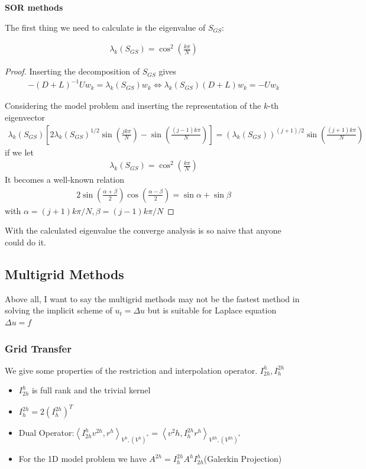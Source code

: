 \documentclass[12pt]{amsart}
\begin{document}
\textbf{SOR methods}

The first thing we need to calculate is the eigenvalue of $S_{GS}$:

\begin{align*}
\lambda_k(S_{GS})=\cos^2(\frac{k\pi}{N})
\end{align*}

\begin{proof}
	Inserting the decomposition of $S_{GS}$ gives
	\begin{align*}
	-(D+L)^{-1}Uw_k = \lambda_k(S_{GS})w_k \Leftrightarrow \lambda_k(S_{GS})(D+L)w_k=-Uw_k
	\end{align*}
	
	Considering the model problem and inserting the representation of the $k$-th eigenvector 
	\begin{align*}
	\lambda_k(S_{GS})\left[2 \lambda_k(S_{GS})^{1/2}\sin(\frac{jk\pi}{N}) -\sin(\frac{(j-1)k\pi}{N}) \right]=(\lambda_k(S_{GS}))^{(j+1)/2}\sin(\frac{(j+1)k\pi}{N})
	\end{align*}
	if we let
	\begin{align*}
	\lambda_k(S_{GS})=\cos^2(\frac{k\pi}{N})
	\end{align*}
	It becomes a well-known relation
	\begin{align*}
	2\sin(\frac{\alpha+\beta}{2})\cos(\frac{\alpha-\beta}{2})=\sin \alpha+\sin\beta
	\end{align*}
	with $\alpha=(j+1)k\pi/N,\beta=(j-1)k\pi/N$
\end{proof}
With the calculated eigenvalue the converge analysis is so naive that anyone could do it.
\subsection{Multigrid Methods}

Above all, I want to say the multigrid methods may not be the fastest method in solving the implicit scheme of $u_t=\Delta u$ but is suitable for Laplace equation $\Delta u=f$
\subsubsection{Grid Transfer}

We give some properties of the restriction and interpolation operator. $I_{2h}^h,I_h^{2h}$
\begin{itemize}
	\item $I_{2h}^{h}$ is full rank and the trivial kernel
	\item $I_h^{2h}=2(I_h^{2h})^T$
	\item Dual Operator:$\left<I_{2h}^hv^{2h},r^h\right>_{V^h,(V^h)^*}=\left<v^2h,I_h^{2h}r^h\right>_{V^{2h},(V^{2h})^*}$
	\item For the 1D model problem we have $A^{2h}=I_h^{2h}A^hI_{2h}^h$(Galerkin Projection)
\end{itemize}
\end{document}
